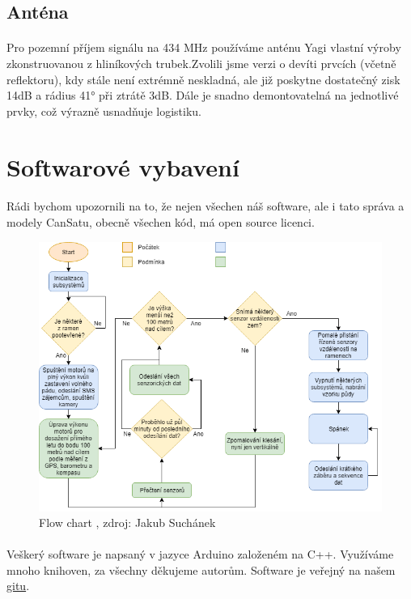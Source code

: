 \documentclass[a4paper]{report}
\begin{document}
\subsection{Anténa}
\paragraph{}Pro pozemní příjem signálu na 434 MHz používáme anténu Yagi vlastní výroby zkonstruovanou z hliníkových trubek.Zvolili jsme verzi o devíti prvcích (včetně reflektoru), kdy stále není extrémně neskladná, ale již poskytne dostatečný zisk 14dB a rádius 41° při ztrátě 3dB. Dále je snadno demontovatelná na jednotlivé prvky, což výrazně usnadňuje logistiku.
\section{Softwarové vybavení}
\paragraph{} Rádi bychom upozornili na to, že nejen všechen náš software, ale i tato správa a modely CanSatu, obecně všechen kód, má open source licenci.
\begin{figure}[!h]
\centering
\caption{Flow chart , zdroj: Jakub Suchánek}
\includegraphics[width=400pt]{Software.png}
\end{figure}
\paragraph{} Veškerý software je napsaný v jazyce Arduino založeném na C++. Využíváme mnoho knihoven, za všechny děkujeme autorům. Software je veřejný na našem \href{https://github.com/suchanekj/CanSatGOSA}{gitu}.
\end{document}
